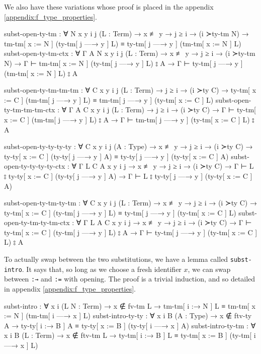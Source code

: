 \documentclass[logo,bsc,singlespacing,parskip,online]{infthesis}
\begin{document}
We also have these variations whose proof is placed in the appendix
\ref{appendix:f_type_properties}.
\begin{code}
  subst-open-ty-tm : ∀ {N x y i j} (L : Term)
    → x ≢ y → j ≥ i → (i ≻ty-tm N)
    → tm-tm[ x := N ] (ty-tm[ j —→ y ] L)
      ≡ ty-tm[ j —→ y ] (tm-tm[ x := N ] L)
  subst-open-ty-tm-ctx : ∀ {Γ A N x y i j} (L : Term)
    → x ≢ y → j ≥ i → (i ≻ty-tm N)
    → Γ ⊢ tm-tm[ x := N ] (ty-tm[ j —→ y ] L) ⦂ A
    → Γ ⊢ ty-tm[ j —→ y ] (tm-tm[ x := N ] L) ⦂ A

  subst-open-ty-tm-tm-tm : ∀ {C x y i j} (L : Term)
    → j ≥ i → (i ≻ty C)
    → ty-tm[ x := C ] (tm-tm[ j —→ y ] L)
      ≡ tm-tm[ j —→ y ] (ty-tm[ x := C ] L)
  subst-open-ty-tm-tm-tm-ctx : ∀ {Γ A C x y i j} (L : Term)
    → j ≥ i → (i ≻ty C)
    → Γ ⊢ ty-tm[ x := C ] (tm-tm[ j —→ y ] L) ⦂ A
    → Γ ⊢ tm-tm[ j —→ y ] (ty-tm[ x := C ] L) ⦂ A

  subst-open-ty-ty-ty-ty : ∀ {C x y i j} (A : Type)
    → x ≢ y → j ≥ i → (i ≻ty C)
    → ty-ty[ x := C ] (ty-ty[ j —→ y ] A)
      ≡ ty-ty[ j —→ y ] (ty-ty[ x := C ] A)
  subst-open-ty-ty-ty-ty-ctx : ∀ {Γ L C A x y i j}
    → x ≢ y → j ≥ i → (i ≻ty C)
    → Γ ⊢ L ⦂ ty-ty[ x := C ] (ty-ty[ j —→ y ] A)
    → Γ ⊢ L ⦂ ty-ty[ j —→ y ] (ty-ty[ x := C ] A)

  subst-open-ty-tm-ty-tm : ∀ {C x y i j} (L : Term)
    → x ≢ y → j ≥ i → (i ≻ty C)
    → ty-tm[ x := C ] (ty-tm[ j —→ y ] L)
      ≡ ty-tm[ j —→ y ] (ty-tm[ x := C ] L)
  subst-open-ty-tm-ty-tm-ctx : ∀ {Γ L A C x y i j}
    → x ≢ y → j ≥ i → (i ≻ty C)
    → Γ ⊢ ty-tm[ x := C ] (ty-tm[ j —→ y ] L) ⦂ A
    → Γ ⊢ ty-tm[ j —→ y ] (ty-tm[ x := C ] L) ⦂ A
\end{code}

To actually swap between the two substitutions, we have a lemma called \texttt{subst-intro}. It says
that, so long as we choose a fresh identifier $x$, we can swap between \texttt{:→} and \texttt{:=}
with opening. The proof is a trivial induction, and so detailed in appendix \ref{appendix:f_type_properties}.
\begin{code}
  subst-intro : ∀ {x i} (L N : Term) → x ∉ fv-tm L
    → tm-tm[ i :→ N ] L ≡ tm-tm[ x := N ] (tm-tm[ i —→ x ] L)
  subst-intro-ty-ty : ∀ {x i B} (A : Type) → x ∉ ftv-ty A
    → ty-ty[ i :→ B ] A ≡ ty-ty[ x := B ] (ty-ty[ i —→ x ] A)
  subst-intro-ty-tm : ∀ {x i B} (L : Term) → x ∉ ftv-tm L
    → ty-tm[ i :→ B ] L ≡ ty-tm[ x := B ] (ty-tm[ i —→ x ] L)
\end{code}
\end{document}
